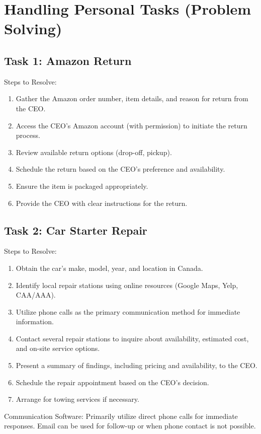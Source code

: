 \documentclass{article}
\begin{document}
\section{Handling Personal Tasks (Problem Solving)}

\subsection{Task 1: Amazon Return}
Steps to Resolve:
\begin{enumerate}
    \item Gather the Amazon order number, item details, and reason for return from the CEO.
    \item Access the CEO's Amazon account (with permission) to initiate the return process.
    \item Review available return options (drop-off, pickup).
    \item Schedule the return based on the CEO's preference and availability.
    \item Ensure the item is packaged appropriately.
    \item Provide the CEO with clear instructions for the return.
\end{enumerate}

\subsection{Task 2: Car Starter Repair}
Steps to Resolve:
\begin{enumerate}
    \item Obtain the car's make, model, year, and location in Canada.
    \item Identify local repair stations using online resources (Google Maps, Yelp, CAA/AAA).
    \item Utilize phone calls as the primary communication method for immediate information.
    \item Contact several repair stations to inquire about availability, estimated cost, and on-site service options.
    \item Present a summary of findings, including pricing and availability, to the CEO.
    \item Schedule the repair appointment based on the CEO's decision.
    \item Arrange for towing services if necessary.
\end{enumerate}
Communication Software: Primarily utilize direct phone calls for immediate responses. Email can be used for follow-up or when phone contact is not possible.
\end{document}

